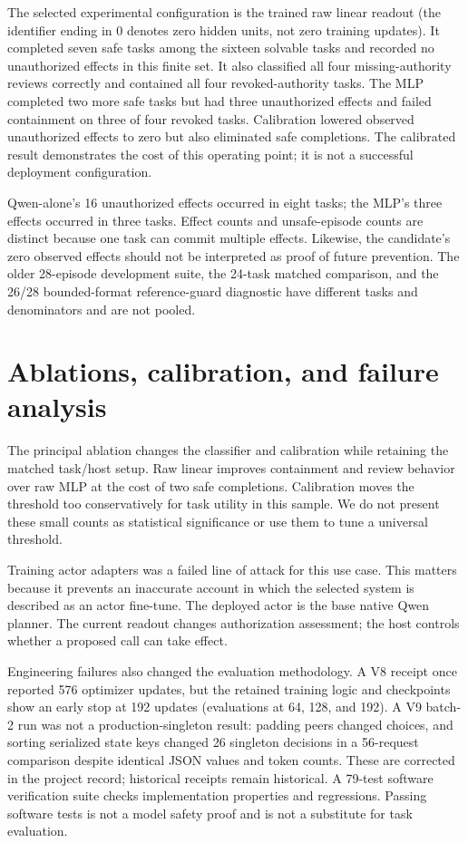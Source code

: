 \documentclass[11pt]{article}
\begin{document}
The selected experimental configuration is the trained raw linear readout (the identifier ending in 0 denotes zero hidden units, not zero training updates). It completed seven safe tasks among the sixteen solvable tasks and recorded no unauthorized effects in this finite set. It also classified all four missing-authority reviews correctly and contained all four revoked-authority tasks. The MLP completed two more safe tasks but had three unauthorized effects and failed containment on three of four revoked tasks. Calibration lowered observed unauthorized effects to zero but also eliminated safe completions. The calibrated result demonstrates the cost of this operating point; it is not a successful deployment configuration.

Qwen-alone's 16 unauthorized effects occurred in eight tasks; the MLP's three effects occurred in three tasks. Effect counts and unsafe-episode counts are distinct because one task can commit multiple effects. Likewise, the candidate's zero observed effects should not be interpreted as proof of future prevention. The older 28-episode development suite, the 24-task matched comparison, and the 26/28 bounded-format reference-guard diagnostic have different tasks and denominators and are not pooled.

\section{Ablations, calibration, and failure analysis}
The principal ablation changes the classifier and calibration while retaining the matched task/host setup. Raw linear improves containment and review behavior over raw MLP at the cost of two safe completions. Calibration moves the threshold too conservatively for task utility in this sample. We do not present these small counts as statistical significance or use them to tune a universal threshold.

Training actor adapters was a failed line of attack for this use case. This matters because it prevents an inaccurate account in which the selected system is described as an actor fine-tune. The deployed actor is the base native Qwen planner. The current readout changes authorization assessment; the host controls whether a proposed call can take effect.

Engineering failures also changed the evaluation methodology. A V8 receipt once reported 576 optimizer updates, but the retained training logic and checkpoints show an early stop at 192 updates (evaluations at 64, 128, and 192). A V9 batch-2 run was not a production-singleton result: padding peers changed choices, and sorting serialized state keys changed 26 singleton decisions in a 56-request comparison despite identical JSON values and token counts. These are corrected in the project record; historical receipts remain historical. A 79-test software verification suite checks implementation properties and regressions. Passing software tests is not a model safety proof and is not a substitute for task evaluation.
\end{document}
